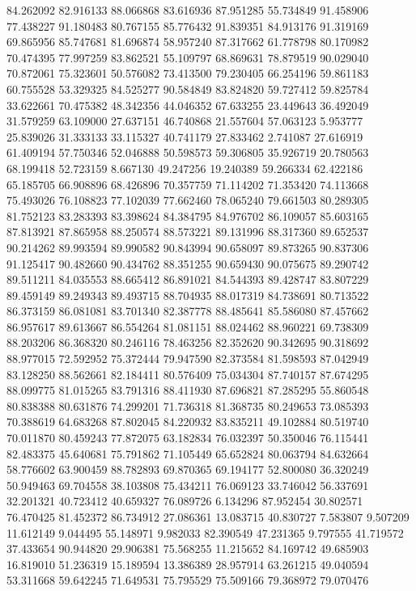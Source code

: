 84.262092
82.916133
88.066868
83.616936
87.951285
55.734849
91.458906
77.438227
91.180483
80.767155
85.776432
91.839351
84.913176
91.319169
69.865956
85.747681
81.696874
58.957240
87.317662
61.778798
80.170982
70.474395
77.997259
83.862521
55.109797
68.869631
78.879519
90.029040
70.872061
75.323601
50.576082
73.413500
79.230405
66.254196
59.861183
60.755528
53.329325
84.525277
90.584849
83.824820
59.727412
59.825784
33.622661
70.475382
48.342356
44.046352
67.633255
23.449643
36.492049
31.579259
63.109000
27.637151
46.740868
21.557604
57.063123
5.953777
25.839026
31.333133
33.115327
40.741179
27.833462
2.741087
27.616919
61.409194
57.750346
52.046888
50.598573
59.306805
35.926719
20.780563
68.199418
52.723159
8.667130
49.247256
19.240389
59.266334
62.422186
65.185705
66.908896
68.426896
70.357759
71.114202
71.353420
74.113668
75.493026
76.108823
77.102039
77.662460
78.065240
79.661503
80.289305
81.752123
83.283393
83.398624
84.384795
84.976702
86.109057
85.603165
87.813921
87.865958
88.250574
88.573221
89.131996
88.317360
89.652537
90.214262
89.993594
89.990582
90.843994
90.658097
89.873265
90.837306
91.125417
90.482660
90.434762
88.351255
90.659430
90.075675
89.290742
89.511211
84.035553
88.665412
86.891021
84.544393
89.428747
83.807229
89.459149
89.249343
89.493715
88.704935
88.017319
84.738691
80.713522
86.373159
86.081081
83.701340
82.387778
88.485641
85.586080
87.457662
86.957617
89.613667
86.554264
81.081151
88.024462
88.960221
69.738309
88.203206
86.368320
80.246116
78.463256
82.352620
90.342695
90.318692
88.977015
72.592952
75.372444
79.947590
82.373584
81.598593
87.042949
83.128250
88.562661
82.184411
80.576409
75.034304
87.740157
87.674295
88.099775
81.015265
83.791316
88.411930
87.696821
87.285295
55.860548
80.838388
80.631876
74.299201
71.736318
81.368735
80.249653
73.085393
70.388619
64.683268
87.802045
84.220932
83.835211
49.102884
80.519740
70.011870
80.459243
77.872075
63.182834
76.032397
50.350046
76.115441
82.483375
45.640681
75.791862
71.105449
65.652824
80.063794
84.632664
58.776602
63.900459
88.782893
69.870365
69.194177
52.800080
36.320249
50.949463
69.704558
38.103808
75.434211
76.069123
33.746042
56.337691
32.201321
40.723412
40.659327
76.089726
6.134296
87.952454
30.802571
76.470425
81.452372
86.734912
27.086361
13.083715
40.830727
7.583807
9.507209
11.612149
9.044495
55.148971
9.982033
82.390549
47.231365
9.797555
41.719572
37.433654
90.944820
29.906381
75.568255
11.215652
84.169742
49.685903
16.819010
51.236319
15.189594
13.386389
28.957914
63.261215
49.040594
53.311668
59.642245
71.649531
75.795529
75.509166
79.368972
79.070476
